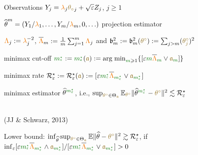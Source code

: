 \begin{overlayarea}{\textwidth}{\textheight}%
Observations  $Y_j=\collambda_j{\colthetao}_{j}+\sqrt{\ObSoNoL}Z_j$, ${j\geq1}$ 
\begin{rudiListeS}[\setListeL{2ex}{1.5ex}{5ex}{5ex}] 
\item  $\widehat{\coltheta}^{\colm} = (Y_1/\collambda_1, \ldots,
  Y_{\colm}/\collambda_{\colm},0,\ldots)$ projection estimator
\item $\Evs_j:= \Ev_j^{-2}$,  $\oEvs[m]:=\frac{1}{m}\sum_{j=1}^{m}\Evs_j$ and $\gb_{m}^2:=\gb_{m}^2(\TrSo):=\sum_{j>m} (\TrSo[j])^2$
\end{rudiListeS}
\begin{drListeT}[\setListeL{2ex}{1.5ex}{3ex}{0ex}]
\item<1->%
%
%
\end{drListeT}
\begin{rudiListeS}[\setListeL{1ex}{1.5ex}{5ex}{5ex}]
\item<4-> {\rudicolor minimax} cut-off $\oeDi:=\oeDi(\wSo):=\argmin\nolimits_{\Di\geq
    1} \{ [\epsilon \Di \oEvs  \vee \wSo_{\Di}]\} $
\item<5-> {\rudicolor minimax} rate $\oeRa :=\oeRa (\wSo):=[\epsilon \oeDi \oEvs[\oeDi] \vee\wSo_{\oeDi}]$%
\item<6-> {\rudicolor minimax} estimator $\hSo^{\oeDi}$, i.e., $\sup_{\TrSo\in\cwSo}\Ex_{\TrSo}  \normV{\hSo^{\oeDi}-\TrSo}^2\lesssim \oeRa$
\end{rudiListeS}
\hfill\\[.5ex]
\hfill{\footnotesize (JJ \& Schwarz, 2013)}\\
\begin{drListeT}[\setListeL{2ex}{0ex}{3ex}{0ex}]
\item<7->{Lower bound}: $\inf_{\hSo}\sup_{\TrSo\in\cwSo} \Ex
  \normV{\hSo-\TrSo}^2\gtrsim \oeRa$, if\\[.5ex]\hfill\small $\inf_\ObSoNoL [\epsilon \oeDi
  \oEvs[\oeDi] \wedge\wSo_{\oeDi}]/[\epsilon \oeDi
  \oEvs[\oeDi] \vee\wSo_{\oeDi}]>0$
\end{drListeT}
\end{overlayarea}
